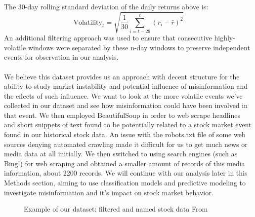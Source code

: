 \documentclass{article}
\begin{document}
The 30-day rolling standard deviation of the daily returns above is:
\[
\text{Volatility}_t = \sqrt{\frac{1}{30} \sum_{i=t-29}^{t} (r_i - \bar{r})^2}
\]
An additional filtering approach was used to ensure that consecutive highly-volatile windows were separated by these n-day windows to preserve independent events for observation in our analysis.
\\\\
We believe this dataset provides us an approach with decent structure for the ability to study market instability and potential influence of misinformation and the effects of such influence. We want to look at the more volatile events we’ve collected in our dataset and see how misinformation could have been involved in that event. We then employed BeautifulSoup in order to web scrape headlines and short snippets of text found to be potentially related to a stock market event found in our historical stock data. An issue with the robots.txt file of some web sources denying automated crawling made it difficult for us to get much news or media data at all initially. We then switched to using search engines (such as Bing!) for web scraping and obtained a smaller amount of records of this media information, about 2200 records. We will continue with our analysis later in this Methods section, aiming to use classification models and predictive modeling to investigate misinformation and it's impact on stock market behavior. 

\begin{figure}[H]
\centering
{}\hfill
{}\hfill
{}
\caption{Example of our dataset: filtered and named stock data From \cite{YfinanceData}} \label{fig:1}
\end{figure}
\end{document}
